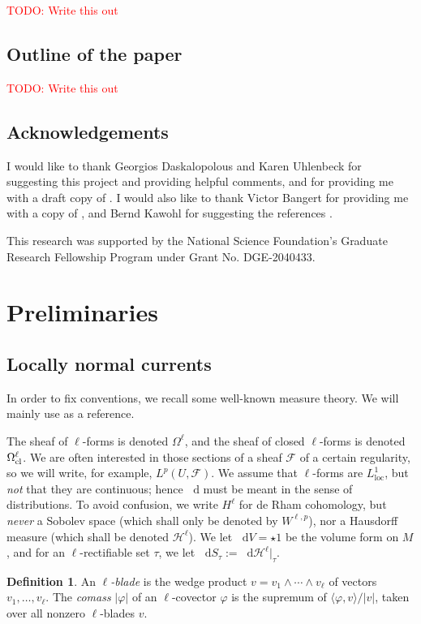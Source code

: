 \documentclass[reqno,11pt]{amsart}
\newcommand*\dif{\mathop{}\!\mathrm{d}}
\newcommand{\dfn}[1]{\emph{#1}\index{#1}}
\newcommand{\loc}{\mathrm{loc}}
\theoremstyle{definition}
\newtheorem{definition}[theorem]{Definition}
\numberwithin{equation}{section}
\newcommand\todo[1]{\textcolor{red}{TODO: #1}}
\begin{document}
\todo{Write this out}

\subsection{Outline of the paper}
\todo{Write this out}

\subsection{Acknowledgements}
I would like to thank Georgios Daskalopolous and Karen Uhlenbeck for suggesting this project and providing helpful comments, and for providing me with a draft copy of \cite{daskalopoulos2023}.
I would also like to thank Victor Bangert for providing me with a copy of \cite{Auer12}, and Bernd Kawohl for suggesting the references \cite{Kawohl2003, Grieser05}.

This research was supported by the National Science Foundation's Graduate Research Fellowship Program under Grant No. DGE-2040433.


\section{Preliminaries}\label{prevResults}
\subsection{Locally normal currents}
In order to fix conventions, we recall some well-known measure theory.
We will mainly use \cite{simon1983GMT} as a reference.

The sheaf of $\ell$-forms is denoted $\Omega^\ell$, and the sheaf of closed $\ell$-forms is denoted $\Omega^\ell_{\rm cl}$.
We are often interested in those sections of a sheaf $\mathscr F$ of a certain regularity, so we will write, for example, $L^p(U, \mathscr F)$.
We assume that $\ell$-forms are $L^1_\loc$, but \emph{not} that they are continuous; hence $\dif$ must be meant in the sense of distributions.
To avoid confusion, we write $H^\ell$ for de Rham cohomology, but \emph{never} a Sobolev space (which shall only be denoted by $W^{\ell, p}$), nor a Hausdorff measure (which shall be denoted $\mathcal H^\ell$).
We let $\dif V = \star 1$ be the volume form on $M$, and for an $\ell$-rectifiable set $\tau$, we let $\dif S_\tau := \dif \mathcal H^\ell|_\tau$.

\begin{definition}
An \dfn{$\ell$-blade} is the wedge product $v = v_1 \wedge \cdots \wedge v_\ell$ of vectors $v_1, \dots, v_\ell$.
The \dfn{comass} $|\varphi|$ of an $\ell$-covector $\varphi$ is the supremum of $\langle \varphi, v\rangle/|v|$, taken over all nonzero $\ell$-blades $v$.
\end{definition}
\end{document}
